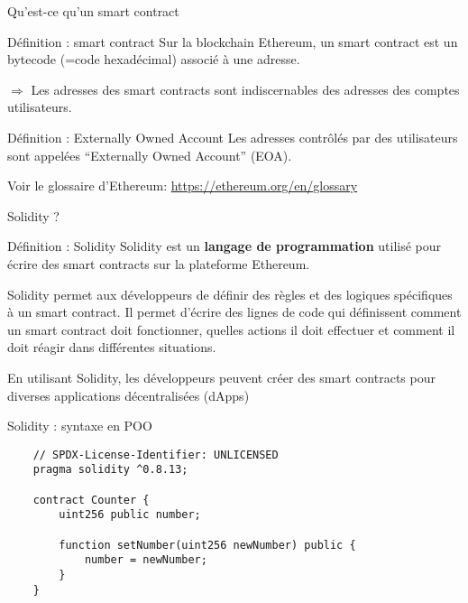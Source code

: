 
\begin{frame}{Qu'est-ce qu'un smart contract}
  \begin{block}{Définition : smart contract}
    Sur la blockchain Ethereum, un smart contract est un bytecode (=code hexadécimal) associé à une adresse.

    $\Rightarrow$ Les adresses des smart contracts sont indiscernables des adresses des comptes utilisateurs.
  \end{block}

  \begin{block}{Définition : Externally Owned Account}
    Les adresses contrôlés par des utilisateurs sont appelées \enquote{Externally Owned Account} (EOA).
  \end{block}

  Voir le glossaire d'Ethereum: \url{https://ethereum.org/en/glossary}
\end{frame}

\begin{frame}{Solidity ?}
  \begin{block}{Définition : Solidity}
    Solidity est un \textbf{langage de programmation} utilisé pour écrire des smart contracts sur la plateforme Ethereum.

    Solidity permet aux développeurs de définir des règles et des logiques spécifiques à un smart contract.
    Il permet d'écrire des lignes de code qui définissent comment un smart contract doit fonctionner, quelles actions il doit effectuer et comment il doit réagir dans différentes situations.

    En utilisant Solidity, les développeurs peuvent créer des smart contracts pour diverses applications décentralisées (dApps)
  \end{block}
\end{frame}

\begin{frame}[fragile]{Solidity : syntaxe en POO}
  \begin{verbatim}
    // SPDX-License-Identifier: UNLICENSED
    pragma solidity ^0.8.13;
    
    contract Counter {
        uint256 public number;
    
        function setNumber(uint256 newNumber) public {
            number = newNumber;
        }
    }
  \end{verbatim}
\end{frame}

